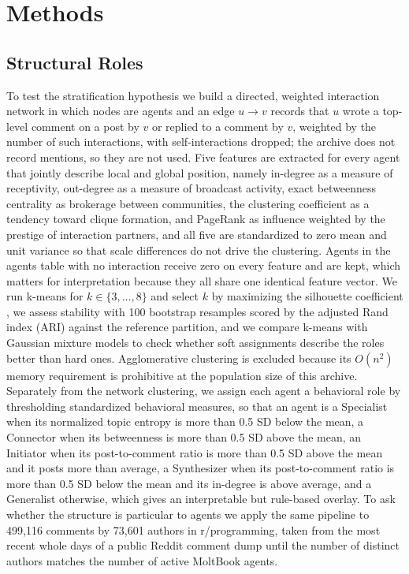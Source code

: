 \documentclass{article}
\begin{document}
\section{Methods}
\label{sec:methods}

\subsection{Structural Roles}

To test the stratification hypothesis we build a directed, weighted interaction network in which nodes are agents and an edge $u \to v$ records that $u$ wrote a top-level comment on a post by $v$ or replied to a comment by $v$, weighted by the number of such interactions, with self-interactions dropped; the archive does not record mentions, so they are not used. Five features are extracted for every agent that jointly describe local and global position, namely in-degree as a measure of receptivity, out-degree as a measure of broadcast activity, exact betweenness centrality as brokerage between communities, the clustering coefficient as a tendency toward clique formation, and PageRank as influence weighted by the prestige of interaction partners, and all five are standardized to zero mean and unit variance so that scale differences do not drive the clustering. Agents in the agents table with no interaction receive zero on every feature and are kept, which matters for interpretation because they all share one identical feature vector. We run k-means for $k \in \{3,\ldots,8\}$ and select $k$ by maximizing the silhouette coefficient \citep{rousseeuw1987silhouettes}, we assess stability with 100 bootstrap resamples scored by the adjusted Rand index (ARI) against the reference partition, and we compare k-means with Gaussian mixture models to check whether soft assignments describe the roles better than hard ones. Agglomerative clustering is excluded because its $O(n^2)$ memory requirement is prohibitive at the population size of this archive. Separately from the network clustering, we assign each agent a behavioral role by thresholding standardized behavioral measures, so that an agent is a Specialist when its normalized topic entropy is more than 0.5 SD below the mean, a Connector when its betweenness is more than 0.5 SD above the mean, an Initiator when its post-to-comment ratio is more than 0.5 SD above the mean and it posts more than average, a Synthesizer when its post-to-comment ratio is more than 0.5 SD below the mean and its in-degree is above average, and a Generalist otherwise, which gives an interpretable but rule-based overlay. To ask whether the structure is particular to agents we apply the same pipeline to 499,116 comments by 73,601 authors in r/programming, taken from the most recent whole days of a public Reddit comment dump until the number of distinct authors matches the number of active MoltBook agents.
\end{document}
